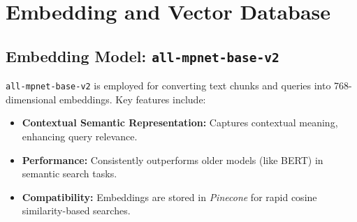 \section{Embedding and Vector Database}
\label{sec:embedding_vector_db}

\subsection{Embedding Model: \texttt{all-mpnet-base-v2}}
\label{subsec:all_mpnet_base_v2}
\texttt{all-mpnet-base-v2} is employed for converting text chunks and queries into 768-dimensional embeddings. Key features include:
\begin{itemize}
  \item \textbf{Contextual Semantic Representation:} Captures contextual meaning, enhancing query relevance.
  \item \textbf{Performance:} Consistently outperforms older models (like BERT) in semantic search tasks.
  \item \textbf{Compatibility:} Embeddings are stored in \emph{Pinecone} for rapid cosine similarity-based searches.
\end{itemize}

